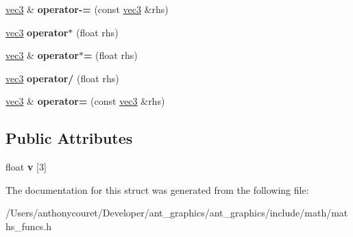 \begin{DoxyCompactItemize}
\item 
\hypertarget{structvec3_aa94851baf570e3a6b80709dcef11a50a}{\hyperlink{structvec3}{vec3} \& {\bfseries operator-\/=} (const \hyperlink{structvec3}{vec3} \&rhs)}\label{structvec3_aa94851baf570e3a6b80709dcef11a50a}

\item 
\hypertarget{structvec3_a05a4e8fb5c200d94adcde55a56059eb5}{\hyperlink{structvec3}{vec3} {\bfseries operator$\ast$} (float rhs)}\label{structvec3_a05a4e8fb5c200d94adcde55a56059eb5}

\item 
\hypertarget{structvec3_a257f04b0ac3398d3eb642f01e45cb481}{\hyperlink{structvec3}{vec3} \& {\bfseries operator$\ast$=} (float rhs)}\label{structvec3_a257f04b0ac3398d3eb642f01e45cb481}

\item 
\hypertarget{structvec3_af22743e3eb7df2d73305bdf47680b1d9}{\hyperlink{structvec3}{vec3} {\bfseries operator/} (float rhs)}\label{structvec3_af22743e3eb7df2d73305bdf47680b1d9}

\item 
\hypertarget{structvec3_a7abca738940e3cc8810455fd5c8508b2}{\hyperlink{structvec3}{vec3} \& {\bfseries operator=} (const \hyperlink{structvec3}{vec3} \&rhs)}\label{structvec3_a7abca738940e3cc8810455fd5c8508b2}

\end{DoxyCompactItemize}
\subsection*{Public Attributes}
\begin{DoxyCompactItemize}
\item 
\hypertarget{structvec3_ad09608040a1a4e4d026086eff69725d2}{float {\bfseries v} \mbox{[}3\mbox{]}}\label{structvec3_ad09608040a1a4e4d026086eff69725d2}

\end{DoxyCompactItemize}


The documentation for this struct was generated from the following file\+:\begin{DoxyCompactItemize}
\item 
/\+Users/anthonycouret/\+Developer/ant\+\_\+graphics/ant\+\_\+graphics/include/math/maths\+\_\+funcs.\+h\end{DoxyCompactItemize}
